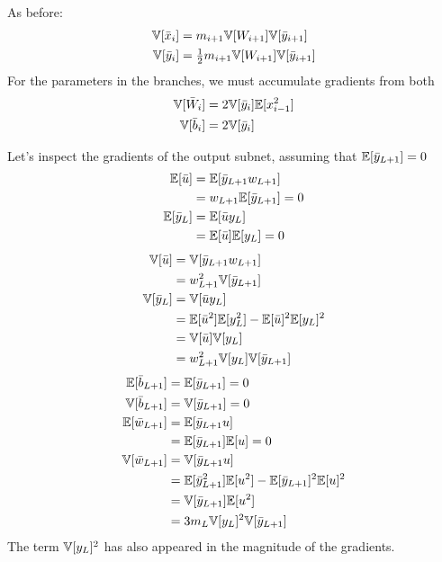 As before:
\begin{align}
\mathbb{V}[\bar{x}_{i}] & = m_{i+1} \mathbb{V}[W_{i+1}] \mathbb{V}[\bar{y}_{i+1}] \\
\mathbb{V}[\bar{y}_{i}] & = \tfrac{1}{2} m_{i+1} \mathbb{V}[W_{i+1}] \mathbb{V}[\bar{y}_{i+1}]
\end{align}
For the parameters in the branches, we must accumulate gradients from both
\begin{align}
\mathbb{V}[\bar{W}_{i}] & = 2 \mathbb{V}[\bar{y}_{i}] \mathbb{E}[x_{i-1}^2] \\
\mathbb{V}[\bar{b}_{i}] & = 2 \mathbb{V}[\bar{y}_{i}]
\end{align}

Let's inspect the gradients of the output subnet, assuming that $\mathbb{E}[\bar{y}_{L+1}] = 0$
\begin{align}
\mathbb{E}[\bar{u}]
& = \mathbb{E}[\bar{y}_{L+1} w_{L+1}] \\
& = w_{L+1} \mathbb{E}[\bar{y}_{L+1}] = 0 \\
\mathbb{E}[\bar{y}_{L}] & = \mathbb{E}[\bar{u} y_{L}] \\
& = \mathbb{E}[\bar{u}] \mathbb{E}[y_{L}] = 0
\end{align}
\begin{align}
\mathbb{V}[\bar{u}]
& = \mathbb{V}[\bar{y}_{L+1} w_{L+1}] \\
& = w_{L+1}^2 \mathbb{V}[\bar{y}_{L+1}] \\
\mathbb{V}[\bar{y}_{L}]
& = \mathbb{V}[\bar{u} y_{L}] \\
& = \mathbb{E}[\bar{u}^2] \mathbb{E}[y_{L}^2] - \mathbb{E}[\bar{u}]^2 \mathbb{E}[y_{L}]^2 \\
& = \mathbb{V}[\bar{u}] \mathbb{V}[y_{L}] \\
& = w_{L+1}^2 \mathbb{V}[y_{L}] \mathbb{V}[\bar{y}_{L+1}]
\end{align}
\begin{align}
\mathbb{E}[\bar{b}_{L+1}] & = \mathbb{E}[\bar{y}_{L+1}] = 0 \\
\mathbb{V}[\bar{b}_{L+1}] & = \mathbb{V}[\bar{y}_{L+1}] = 0 \\
\mathbb{E}[\bar{w}_{L+1}]
& = \mathbb{E}[\bar{y}_{L+1} u] \\
& = \mathbb{E}[\bar{y}_{L+1}] \mathbb{E}[u] = 0 \\
\mathbb{V}[\bar{w}_{L+1}]
& = \mathbb{V}[\bar{y}_{L+1} u] \\
& = \mathbb{E}[\bar{y}_{L+1}^2] \mathbb{E}[u^2] - \mathbb{E}[\bar{y}_{L+1}]^2 \mathbb{E}[u]^2 \\
& = \mathbb{V}[\bar{y}_{L+1}] \mathbb{E}[u^2] \\
& = 3 m_{L} \mathbb{V}[y_{L}]^2 \mathbb{V}[\bar{y}_{L+1}]
\end{align}
The term $\mathbb{V}[y_{L}]^2$ has also appeared in the magnitude of the gradients.

